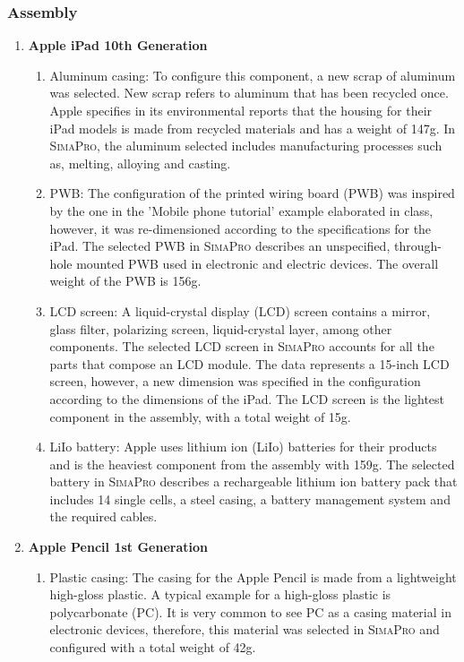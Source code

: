 \subsubsection*{Assembly}
\begin{enumerate}
    \item \textbf{Apple iPad 10th Generation \cite{apple2022environment}}
    \begin{enumerate}
        \item Aluminum casing: To configure this component, a new scrap of aluminum was selected. New scrap refers to aluminum that has been recycled once. Apple specifies in its environmental reports that the housing for their iPad models is made from recycled materials and has a weight of 147g. In \textsc{SimaPro}, the aluminum selected includes manufacturing processes such as, melting, alloying and casting. 
        \item PWB: The configuration of the printed wiring board (PWB) was inspired by the one in the 'Mobile phone tutorial' example elaborated in class, however, it was re-dimensioned according to the specifications for the iPad. The selected PWB in \textsc{SimaPro} describes an unspecified, through-hole mounted PWB used in electronic and electric devices. The overall weight of the PWB is 156g. 
        \item LCD screen: A liquid-crystal display (LCD) screen contains a mirror, glass filter, polarizing screen, liquid-crystal layer, among other components. The selected LCD screen in \textsc{SimaPro} accounts for all the parts that compose an LCD module. The data represents a 15-inch LCD screen, however, a new dimension was specified in the configuration according to the dimensions of the iPad. The LCD screen is the lightest component in the assembly, with a total weight of 15g. 
        \item LiIo battery: Apple uses lithium ion (LiIo) batteries for their products and is the heaviest component from the assembly with 159g. The selected battery in \textsc{SimaPro} describes a rechargeable lithium ion battery pack that includes 14 single cells, a steel casing, a battery management system and the required cables. 
    \end{enumerate}
    \item \textbf{Apple Pencil 1st Generation}
    \begin{enumerate}
        \item Plastic casing: The casing for the Apple Pencil is made from a lightweight high-gloss plastic. A typical example for a high-gloss plastic is polycarbonate (PC). It is very common to see PC as a casing material in electronic devices, therefore, this material was selected in \textsc{SimaPro} and configured with a total weight of 42g. 

\end{enumerate}
\end{enumerate}
